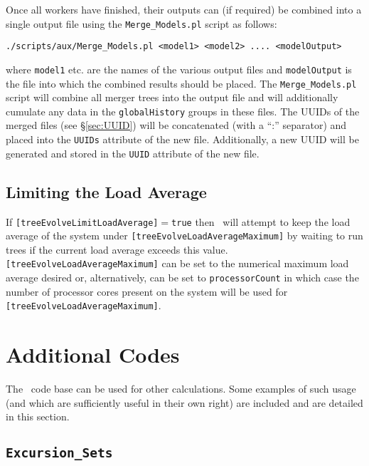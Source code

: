Once all workers have finished, their outputs can (if required) be combined into a single output file using the {\tt Merge\_Models.pl} script as follows:
\begin{verbatim}
./scripts/aux/Merge_Models.pl <model1> <model2> .... <modelOutput>
\end{verbatim}
where {\tt model1} etc. are the names of the various output files and {\tt modelOutput} is the file into which the combined results should be placed. The {\tt Merge\_Models.pl} script will combine all merger trees into the output file and will additionally cumulate any data in the {\tt globalHistory} groups in these files. The UUIDs of the merged files (see \S\ref{sec:UUID}) will be concatenated (with a ``:'' separator) and placed into the {\tt UUIDs} attribute of the new file. Additionally, a new UUID will be generated and stored in the {\tt UUID} attribute of the new file.

\subsection{Limiting the Load Average}

If {\tt [treeEvolveLimitLoadAverage]}$=${\tt true} then \glc\ will attempt to keep the load average of the system under {\tt [treeEvolveLoadAverageMaximum]} by waiting to run trees if the current load average exceeds this value. {\tt [treeEvolveLoadAverageMaximum]} can be set to the numerical maximum load average desired or, alternatively, can be set to {\tt processorCount} in which case the number of processor cores present on the system will be used for {\tt [treeEvolveLoadAverageMaximum]}.

\section{Additional Codes}

The \glc\ code base can be used for other calculations. Some examples of such usage (and which are sufficiently useful in their own right) are included and are detailed in this section.

\subsection{{\tt Excursion\_Sets}}

